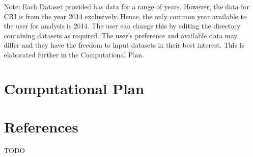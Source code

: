 \documentclass[fontsize=11pt]{article}
\begin{document}
    Note: Each Dataset provided has data for a range of years. However, the data for CRI is from the year 2014 exclusively. Hence, the only common year available to the user for analysis is 2014. The user can change this by editing the directory containing datasets as required. The user’s preference and available data may differ and they have the freedom to input datasets in their best interest. This is elaborated further in the Computational Plan.


\section*{Computational Plan}



\section*{References}

TODO
\end{document}
